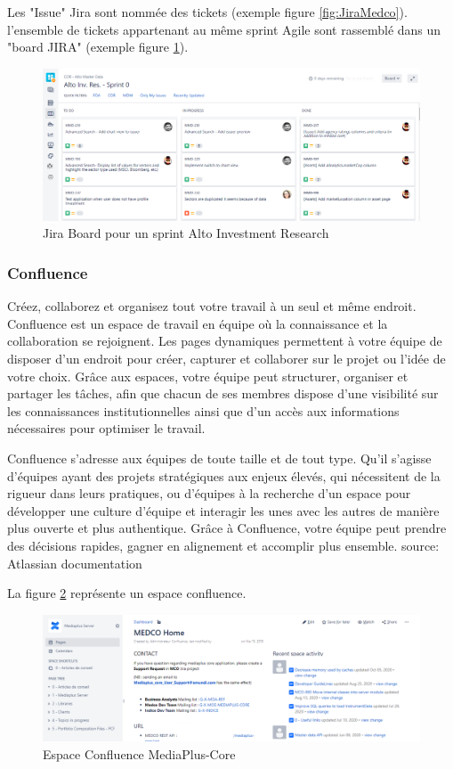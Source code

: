 \par Les "Issue" Jira sont nommée des tickets (exemple figure \ref{fig:JiraMedco}). l'ensemble de tickets appartenant au même sprint Agile sont rassemblé dans un "board JIRA" (exemple figure \ref{fig:JiraAlto}).
\clearpage
\begin{figure}[ht]
    \centering
    \includegraphics[width=\columnwidth]{img/Sprint Alto.png}
    \caption{Jira Board pour un sprint Alto Investment Research}
    \label{fig:JiraAlto}
\end{figure}
\subsubsection{Confluence}
\par Créez, collaborez et organisez tout votre travail à un seul et même endroit. Confluence est un espace de travail en équipe où la connaissance et la collaboration se rejoignent. Les pages dynamiques permettent à votre équipe de disposer d'un endroit pour créer, capturer et collaborer sur le projet ou l'idée de votre choix. Grâce aux espaces, votre équipe peut structurer, organiser et partager les tâches, afin que chacun de ses membres dispose d'une visibilité sur les connaissances institutionnelles ainsi que d'un accès aux informations nécessaires pour optimiser le travail.
\par Confluence s'adresse aux équipes de toute taille et de tout type. Qu'il s'agisse d'équipes ayant des projets stratégiques aux enjeux élevés, qui nécessitent de la rigueur dans leurs pratiques, ou d'équipes à la recherche d'un espace pour développer une culture d'équipe et interagir les unes avec les autres de manière plus ouverte et plus authentique. Grâce à Confluence, votre équipe peut prendre des décisions rapides, gagner en alignement et accomplir plus ensemble. {\tiny source: Atlassian documentation}
\par La figure \ref{fig:conf} représente un espace confluence.
\begin{figure}[ht]
    \centering
    \includegraphics[width=\columnwidth]{img/ConfMedco.png}
    \caption{Espace Confluence MediaPlus-Core}
    \label{fig:conf}
\end{figure}

